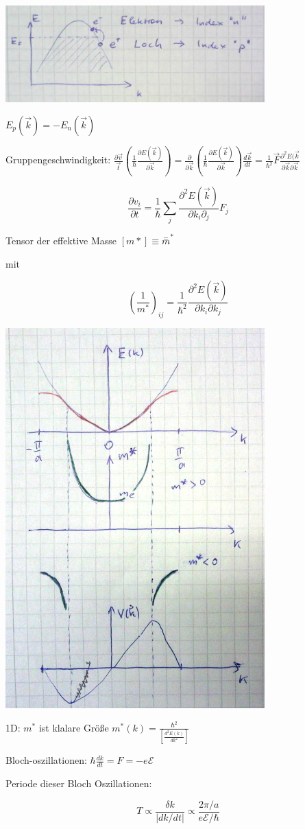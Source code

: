 \includegraphics[width=0.75\textwidth]{kap10_02.png}

\(E_p(\vec k) = -E_n(\vec k)\)

Gruppengeschwindigkeit: \(\frac{\partial \vec v}{\vec t}(\frac{1}{\hbar}\frac{\partial E(\vec k)}{\partial \vec k})=\frac{\partial}{\partial \vec k}(\frac{1}{\hbar}\frac{\partial E(\vec k)}{\partial \vec k})\frac{d\vec k}{dt}=\frac{1}{\hbar^2}\vec F\frac{\partial^2 E(\vec k}{\partial \vec k\partial\vec k}\)

\[\frac{\partial v_i}{\partial t} = \frac{1}{\hbar}\sum_j \frac{\partial^2 E(\vec k)}{\partial k_i\partial_j}F_j\]

Tensor der effektive Masse \([m*]\equiv \stackrel{\mathrm{=}}m^* \)

mit 

\[\left(\frac{1}{m^*}\right)_{ij}=\frac{1}{\hbar^2}\frac{\partial^2 E(\vec k)}{\partial k_i\partial k_j}\]


\includegraphics[width=0.75\textwidth]{kap10_03.png}

1D: \(m^*\) ist klalare Größe \(m^*(k) = \frac{\hbar^2}{[\frac{d^2E(k)}{dk^2}]}\)

Bloch-oszillationen: \(\hbar \frac{dk}{dt} = F = -e\mathcal E\)


Periode dieser Bloch Oszillationen:

\[T\propto \frac{\delta k}{|dk/dt|}\propto \frac{2\pi/a}{e\mathcal E/\hbar}\]



